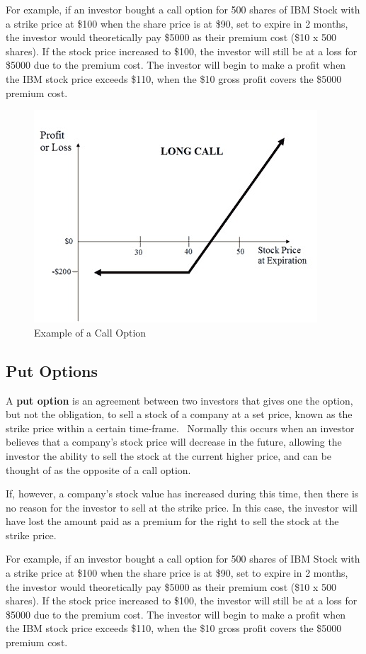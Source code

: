 \documentclass[11pt]{article}
\begin{document}
For example, if an investor bought a call option for 500 shares of IBM Stock with a strike price at \$100 when the share price is at \$90, set to expire in 2 months, the investor would theoretically pay \$5000 as their premium cost (\$10 x 500 shares). If the stock price increased to \$100, the investor will still be at a loss for \$5000 due to the premium cost. The investor will begin to make a profit when the IBM stock price exceeds \$110, when the \$10 gross profit covers the \$5000 premium cost.

\begin{figure}[h]
\centering
\includegraphics[scale=0.5]{long-call}
\caption{Example of a Call Option}
\end{figure}

\subsection{Put Options}
A {\bf put option} is an agreement between two investors that gives one the option, but not the obligation, to sell a stock of a company at a set price, known as the strike price within a certain time-frame.~\cite{put} Normally this occurs when an investor believes that a company's stock price will decrease in the future, allowing the investor the ability to sell the stock at the current higher price, and can be thought of as the opposite of a call option.

If, however, a company's stock value has increased during this time, then there is no reason for the investor to sell at the strike price. In this case, the investor will have lost the amount paid as a premium for the right to sell the stock at the strike price.

For example, if an investor bought a call option for 500 shares of IBM Stock with a strike price at \$100 when the share price is at \$90, set to expire in 2 months, the investor would theoretically pay \$5000 as their premium cost (\$10 x 500 shares). If the stock price increased to \$100, the investor will still be at a loss for \$5000 due to the premium cost. The investor will begin to make a profit when the IBM stock price exceeds \$110, when the \$10 gross profit covers the \$5000 premium cost.
\end{document}
